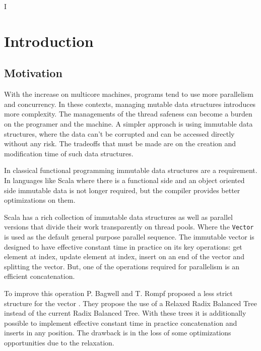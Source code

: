 I%
\lhead{} 

\chapter{Introduction} %
\label{Introduction} %



\section{Motivation}
With the increase on multicore machines, programs tend to use more parallelism and concurrency. In these contexts, managing mutable data structures introduces more complexity. The managements of the thread safeness can become a burden on the programer and the machine. A simpler approach is using immutable data structures, where the data can't be corrupted and can be accessed directly without any risk. The tradeoffs that must be made are on the creation and modification time of such data structures.

In classical functional programming immutable data structures are a requirement. In languages like Scala where there is a functional side and an object oriented side immutable data is not longer required, but the compiler provides better optimizations on them.

Scala has a rich collection of immutable data structures as well as parallel versions that divide their work transparently on thread pools. Where the \texttt{Vector} is used as the default general purpose parallel sequence. The immutable vector is designed to have effective constant time in practice on its key operations: get element at index, update element at index, insert on an end of the vector and splitting the vector. But, one of the operations required for parallelism is an efficient concatenation.

To improve this operation P. Bagwell and T. Rompf proposed a less strict structure for the vector \cite{RRBTrees}. They propose the use of a Relaxed Radix Balanced Tree instead of the current Radix Balanced Tree. With these trees it is additionally possible to implement effective constant time in practice concatenation and inserts in any position. The drawback is in the loss of some optimizations opportunities due to the relaxation.

